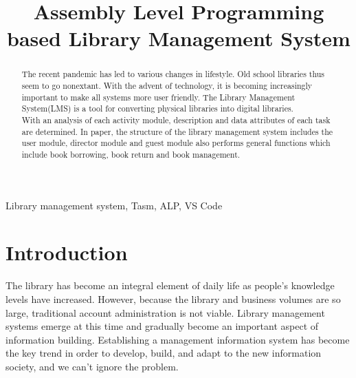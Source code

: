 \documentclass[conference]{IEEEtran}
\begin{document}
\title{Assembly Level Programming based Library Management System}

\author{
}


\maketitle

\begin{abstract}
    The recent pandemic has led to various changes in lifestyle.
    Old school libraries thus seem to go nonextant. With the
    advent of technology,  it is becoming increasingly important
    to make all systems more user friendly. The Library Management
    System(LMS) is a tool for converting physical libraries into
    digital libraries.\\

    With an analysis of each activity module, description and
    data attributes of each task are determined. In paper, the
    structure of the library management system includes the user
    module, director module and guest module also performs general
    functions which include book borrowing, book return and book
    management.
\end{abstract}

\begin{IEEEkeywords}
    Library management system, Tasm, ALP, VS Code
\end{IEEEkeywords}

\section{Introduction}
The library has become an integral element of daily life as people's
knowledge levels have increased. However, because the library and
business volumes are so large, traditional account administration is
not viable. Library management systems emerge at this time and gradually
become an important aspect of information building. Establishing a
management information system has become the key trend in order to develop,
build, and adapt to the new information society, and we can't ignore the
problem.\\
\end{document}
